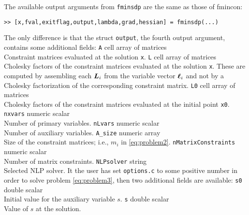 \documentclass{article}
\newcommand{\bm}[1]{\mbox{\boldmath $#1$}}
\begin{document}
The available output arguments from \texttt{fminsdp} are the same as those of fmincon:
\begin{verbatim}
>> [x,fval,exitflag,output,lambda,grad,hessian] = fminsdp(...)
\end{verbatim}
The only difference is that the struct \texttt{output}, the fourth output argument, contains
some additional fields:
\vskip 3mm
\noindent
\texttt{A} \hskip 4.2cm        cell array of matrices  \\
Constraint matrices evaluated at the solution \texttt{x}. 
\vskip 2mm
\noindent
\texttt{L} \hskip 4.2cm        cell array of matrices  \\
Cholesky factors of the constraint matrices evaluated at the solution \texttt{x}. These are computed
by assembling each $\bm{L}_{i}$ from the variable vector $\bm{\ell}_{i}$ and not by a Cholesky factorization
of the corresponding constraint matrix.
\vskip 2mm
\noindent
\texttt{L0} \hskip 4.0cm        cell array of matrices  \\
Cholesky factors of the constraint matrices evaluated at the initial point \texttt{x0}.
\vskip 2mm
\noindent \texttt{nxvars}		\hskip 3.2cm 		numeric scalar \\
Number of primary variables.
\vskip 2mm
\noindent \texttt{nLvars}		\hskip 3.2cm     numeric scalar \\
Number of auxiliary variables.
\vskip 2mm
\noindent \texttt{A\_size}   \hskip 3.3cm     numeric array \\
Size of the constraint matrices; i.e., $m_{i}$ in \eqref{eq:problem2}.
\vskip 2mm
\noindent \texttt{nMatrixConstraints}   \hskip 1cm     numeric scalar \\
Number of matrix constraints.
\vskip 2mm
\noindent \texttt{NLPsolver}   \hskip 2.7cm     string \\
Selected NLP solver.
\vskip 3mm
It the user has set \texttt{options.c} to some positive number in order to solve problem \eqref{eq:problem3},
then two additional fields are available:
\vskip 3mm
\noindent \texttt{s0}   \hskip 2.7cm     double scalar \\
Initial value for the auxiliary variable $s$.
\vskip 2mm
\noindent \texttt{s}   \hskip 2.7cm     double scalar \\
Value of $s$ at the solution.


\end{document}
